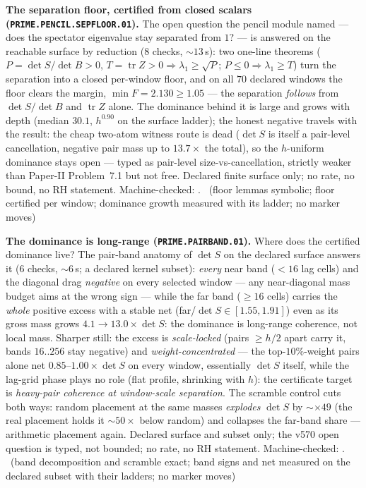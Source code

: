\par\smallskip\noindent\textbf{The separation floor, certified from closed
scalars (\texttt{PRIME.PENCIL.SEPFLOOR.01}).}
The open question the pencil module named --- does the spectator eigenvalue
stay separated from $1$? --- is answered on the reachable surface by
reduction ($8$ checks, ${\sim}13$\,s): two one-line theorems
($P=\det S/\det B>0$, $T=\operatorname{tr}Z>0\Rightarrow\lambda_1\ge\sqrt P$;
$P\le0\Rightarrow\lambda_1\ge T$) turn the separation into a closed
per-window floor, and on all $70$ declared windows the floor clears the
margin, $\min F=2.130\ge1.05$ --- the separation \emph{follows} from
$\det S/\det B$ and $\operatorname{tr}Z$ alone. The dominance behind it is
large and grows with depth (median $30.1$, $h^{0.90}$ on the surface
ladder); the honest negative travels with the result: the cheap two-atom
witness route is dead ($\det S$ is itself a pair-level cancellation,
negative pair mass up to $13.7\times$ the total), so the $h$-uniform
dominance stays open --- typed as pair-level size-vs-cancellation, strictly
weaker than Paper-II Problem~7.1 but not free. Declared finite surface
only; no rate, no bound, no RH statement. Machine-checked:
.
\mE\ (floor lemmas symbolic; floor certified per window; dominance growth
measured with its ladder; no marker moves)
\par\smallskip


\par\smallskip\noindent\textbf{The dominance is long-range
(\texttt{PRIME.PAIRBAND.01}).}
Where does the certified dominance live?  The pair-band anatomy of
$\det S$ on the declared surface answers it ($6$ checks, ${\sim}6$\,s;
a declared kernel subset): \emph{every} near band ($<16$ lag cells) and
the diagonal drag \emph{negative} on every selected window --- any
near-diagonal mass budget aims at the wrong sign --- while the far band
($\ge16$ cells) carries the \emph{whole} positive excess with a stable
net (far/$\det S\in[1.55,1.91]$) even as its gross mass grows
$4.1\to13.0\times\det S$: the dominance is long-range coherence, not
local mass.  Sharper still: the excess is \emph{scale-locked} (pairs
$\ge h/2$ apart carry it, bands $16..256$ stay negative) and
\emph{weight-concentrated} --- the top-$10\%$-weight pairs alone net
$0.85$--$1.00\times\det S$ on every window, essentially $\det S$ itself,
while the lag-grid phase plays no role (flat profile, shrinking with
$h$): the certificate target is \emph{heavy-pair coherence at
window-scale separation}.  The scramble control cuts both ways: random
placement at the same masses \emph{explodes} $\det S$ by
${\sim}\times49$ (the real placement holds it ${\sim}50\times$ below
random) and collapses the far-band share --- arithmetic placement
again.  Declared surface and
subset only; the v570 open question is typed, not bounded; no rate, no
RH statement. Machine-checked:
.
\mE\ (band decomposition and scramble exact; band signs and net measured
on the declared subset with their ladders; no marker moves)
\par\smallskip


